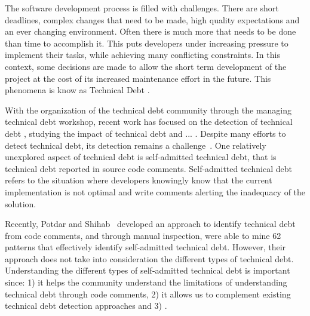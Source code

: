 The software development process is filled with challenges. There are short deadlines, complex changes that need to be made, high quality expectations and an ever changing environment. Often there is much more that needs to be done than time to accomplish it. This puts developers under increasing pressure to implement their tasks, while achieving many conflicting constraints. In this context, some decisions are made to allow the short term development of the project at the cost of its increased maintenance effort in the future. This phenomena is know as Technical Debt \cite{Cunningham1992}. 


With the organization of the technical debt community through the managing technical debt workshop, recent work has focused on the detection of technical debt , studying the impact of technical debt  and ... . Despite many efforts to detect technical debt, its detection remains a challenge~\cite{Potdar2014ICSME}. One relatively unexplored aspect of technical debt is self-admitted technical debt, that is technical debt reported in source code comments. Self-admitted technical debt refers to the situation where developers knowingly know that the current implementation is not optimal and write comments alerting the inadequacy of the solution. 

Recently, Potdar and Shihab~\cite{Potdar2014ICSME} developed an approach to identify technical debt from code comments, and through manual inspection, were able to mine 62 patterns that effectively identify self-admitted technical debt. However, their approach does not take into consideration the different types of technical debt. Understanding the different types of self-admitted technical debt is important since: 1) it helps the community understand the limitations of understanding technical debt through code comments, 2) it allows us to complement existing technical debt detection approaches and 3) . 

